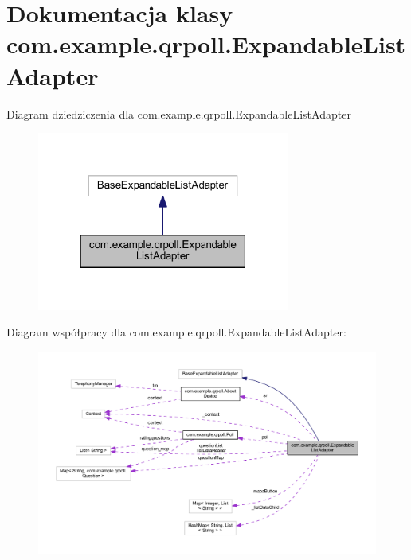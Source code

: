 \hypertarget{classcom_1_1example_1_1qrpoll_1_1_expandable_list_adapter}{\section{Dokumentacja klasy com.\+example.\+qrpoll.\+Expandable\+List\+Adapter}
\label{classcom_1_1example_1_1qrpoll_1_1_expandable_list_adapter}
}


Diagram dziedziczenia dla com.\+example.\+qrpoll.\+Expandable\+List\+Adapter\nopagebreak
\begin{figure}[H]
\begin{center}
\leavevmode
\includegraphics[width=235pt]{classcom_1_1example_1_1qrpoll_1_1_expandable_list_adapter__inherit__graph}
\end{center}
\end{figure}


Diagram współpracy dla com.\+example.\+qrpoll.\+Expandable\+List\+Adapter\+:
\nopagebreak
\begin{figure}[H]
\begin{center}
\leavevmode
\includegraphics[width=350pt]{classcom_1_1example_1_1qrpoll_1_1_expandable_list_adapter__coll__graph}
\end{center}
\end{figure}
